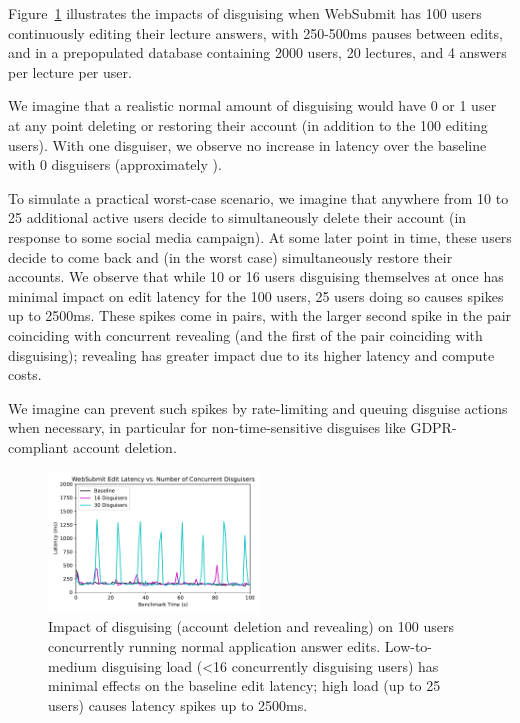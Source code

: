  Figure~\ref{fig:concurrent} illustrates the
impacts of disguising when WebSubmit has 100 users continuously editing their lecture answers, with
250-500ms pauses between edits, and in a prepopulated database containing 2000 users, 20 lectures,
and 4 answers per lecture per user.

We imagine that a realistic normal amount of disguising would have 0 or 1 user at any point deleting
or restoring their account (in addition to the 100 editing users). With one disguiser, we observe no
increase in latency over the baseline with 0 disguisers (approximately ). 

To simulate a practical worst-case scenario, we imagine that anywhere from 10 to 25 additional
active users decide to simultaneously delete their account (\eg in response to some social media
campaign). At some later point in time, these users decide to come back and (in the worst case)
simultaneously restore their accounts. We observe that while 10 or 16 users disguising themselves at once
has minimal impact on edit latency for the 100 users, 25 users doing so causes spikes up to 2500ms.  
%
These spikes come in pairs, with the larger second spike in the pair coinciding with concurrent
revealing (and the first of the pair coinciding with disguising); revealing has greater impact due
to its higher latency and compute costs.

We imagine \sys can prevent such spikes by rate-limiting and queuing disguise actions when
necessary, in particular for non-time-sensitive disguises like GDPR-compliant account deletion.


\begin{figure}[t!]
    \centering
        \includegraphics[width=0.5\textwidth]{figs/websubmit_concurrent_results_20lec_100users}
    \caption{Impact of disguising (account deletion and revealing) on 100 users concurrently running
    normal application answer edits. Low-to-medium disguising load (<16 concurrently disguising users) has
    minimal effects on the baseline edit latency; high load (up to 25 users) causes latency spikes
    up to 2500ms.} 
    \label{fig:concurrent}
\end{figure}
